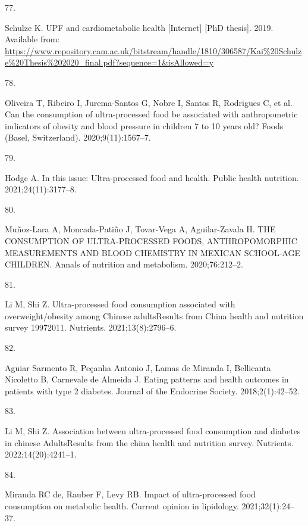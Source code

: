 \documentclass[
]{article}
\newlength{\cslhangindent}
\newlength{\csllabelwidth}
\newlength{\cslentryspacingunit} %
\newenvironment{CSLReferences}[2] %
 {%
  \setlength{\parindent}{0pt}
  \ifodd #1
  \let\oldpar\par
  \def\par{\hangindent=\cslhangindent\oldpar}
  \fi
  \setlength{\parskip}{#2\cslentryspacingunit}
 }%
 {}
\newcommand{\CSLLeftMargin}[1]{\parbox[t]{\csllabelwidth}{#1}}
\newcommand{\CSLRightInline}[1]{\parbox[t]{\linewidth - \csllabelwidth}{#1}\break}
\begin{document}
\begin{CSLReferences}{0}{0}
\leavevmode{}%
\CSLLeftMargin{77. }%
\CSLRightInline{Schulze K. UPF and cardiometabolic health {[}Internet{]}
{[}PhD thesis{]}. 2019. Available from:
\url{https://www.repository.cam.ac.uk/bitstream/handle/1810/306587/Kai\%20Schulze\%20Thesis\%202020_final.pdf?sequence=1\&isAllowed=y}}

\leavevmode{}%
\CSLLeftMargin{78. }%
\CSLRightInline{Oliveira T, Ribeiro I, Jurema-Santos G, Nobre I, Santos
R, Rodrigues C, et al. Can the consumption of ultra-processed food be
associated with anthropometric indicators of obesity and blood pressure
in children 7 to 10 years old? Foods (Basel, Switzerland).
2020;9(11):1567--7. }

\leavevmode{}%
\CSLLeftMargin{79. }%
\CSLRightInline{Hodge A. In this issue: Ultra-processed food and health.
Public health nutrition. 2021;24(11):3177--8. }

\leavevmode{}%
\CSLLeftMargin{80. }%
\CSLRightInline{Muñoz-Lara A, Moncada-Patiño J, Tovar-Vega A,
Aguilar-Zavala H. THE CONSUMPTION OF ULTRA-PROCESSED FOODS,
ANTHROPOMORPHIC MEASUREMENTS AND BLOOD CHEMISTRY IN MEXICAN SCHOOL-AGE
CHILDREN. Annals of nutrition and metabolism. 2020;76:212--2. }

\leavevmode{}%
\CSLLeftMargin{81. }%
\CSLRightInline{Li M, Shi Z. Ultra-processed food consumption associated
with overweight/obesity among Chinese adults{\textemdash}Results from
China health and nutrition survey 1997{\textendash}2011. Nutrients.
2021;13(8):2796--6. }

\leavevmode{}%
\CSLLeftMargin{82. }%
\CSLRightInline{Aguiar Sarmento R, Peçanha Antonio J, Lamas de Miranda
I, Bellicanta Nicoletto B, Carnevale de Almeida J. Eating patterns and
health outcomes in patients with type 2 diabetes. Journal of the
Endocrine Society. 2018;2(1):42--52. }

\leavevmode{}%
\CSLLeftMargin{83. }%
\CSLRightInline{Li M, Shi Z. Association between ultra-processed food
consumption and diabetes in chinese Adults{\textemdash}Results from the
china health and nutrition survey. Nutrients. 2022;14(20):4241--1. }

\leavevmode{}%
\CSLLeftMargin{84. }%
\CSLRightInline{Miranda RC de, Rauber F, Levy RB. Impact of
ultra-processed food consumption on metabolic health. Current opinion in
lipidology. 2021;32(1):24--37. }


\end{CSLReferences}
\end{document}
